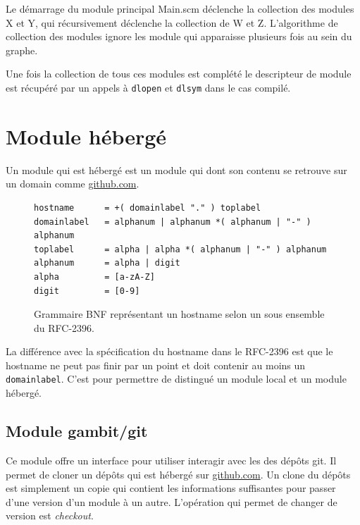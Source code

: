 Le démarrage du module principal Main.scm déclenche la collection des modules X
et Y, qui récursivement déclenche la collection de W et Z. L'algorithme de
collection des modules ignore les module qui apparaisse plusieurs fois au sein
du graphe.

Une fois la collection de tous ces modules est complété le descripteur de
module est récupéré par un appels à \verb|dlopen| et \verb|dlsym| dans le cas
compilé.


\section{Module hébergé}

Un module qui est hébergé est un module qui dont son contenu
se retrouve sur un domain comme \url{github.com}.


\begin{figure}[ht]
\begin{lstlisting}
hostname      = +( domainlabel "." ) toplabel
domainlabel   = alphanum | alphanum *( alphanum | "-" ) alphanum
toplabel      = alpha | alpha *( alphanum | "-" ) alphanum
alphanum      = alpha | digit
alpha         = [a-zA-Z]
digit         = [0-9]
\end{lstlisting}
  \caption{Grammaire BNF représentant un hostname selon un sous
  ensemble du RFC-2396.}
\end{figure}

La différence avec la spécification du hostname dans le RFC-2396
est que le hostname ne peut pas finir par un point et doit contenir
au moins un \verb|domainlabel|. C'est pour permettre de distingué
un module local et un module hébergé.

\subsection{Module gambit/git}

Ce module offre un interface pour utiliser interagir avec les des dépôts git.
Il permet de cloner un dépôts qui est hébergé sur \url{github.com}. Un clone du
dépôts est simplement un copie qui contient les informations suffisantes pour
passer d'une version d'un module à un autre. L'opération qui permet de changer
de version est \emph{checkout}.


